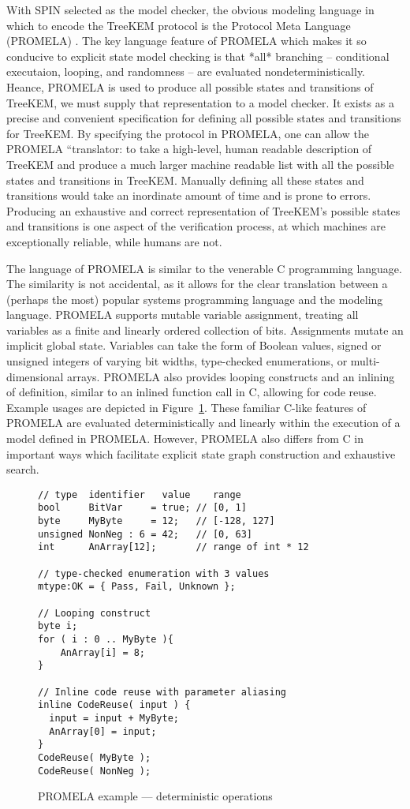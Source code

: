 With SPIN selected as the model checker, the obvious modeling language in which to encode the TreeKEM protocol is the Protocol Meta Language (PROMELA) \autocite{holzmann1980basic, holzmann1990design}.
The key language feature of PROMELA which makes it so conducive to explicit state model checking is that *all* branching -- conditional executaion, looping, and randomness -- are evaluated nondeterministically.
Heance, PROMELA is used to produce all possible states and transitions of TreeKEM, we must supply that representation to a model checker.
It exists as a precise and convenient specification for defining all possible states and transitions for TreeKEM.\@
By specifying the protocol in PROMELA, one can allow the PROMELA ``translator: to take a high-level, human readable description of TreeKEM and produce a much larger machine readable list with all the possible states and transitions in TreeKEM.\@
Manually defining all these states and transitions would take an inordinate amount of time and is prone to errors.
Producing an exhaustive and correct representation of TreeKEM's possible states and transitions is one aspect of the verification process, at which machines are exceptionally reliable, while humans are not.

The language of PROMELA is similar to the venerable C programming language.
The similarity is not accidental, as it allows for the clear translation between a (perhaps the most) popular systems programming language and the modeling language.
PROMELA supports mutable variable assignment, treating all variables as a finite and linearly ordered collection of bits.
Assignments mutate an implicit global state.
Variables can take the form of Boolean values, signed or unsigned integers of varying bit widths, type-checked enumerations, or multi-dimensional arrays.
PROMELA also provides looping constructs and an inlining of definition, similar to an inlined function call in C, allowing for code reuse.
Example usages are depicted in Figure\ \ref{fig:determinism}.
These familiar C-like features of PROMELA are evaluated deterministically and linearly within the execution of a model defined in PROMELA.\@
However, PROMELA also differs from C in important ways which facilitate explicit state graph construction and exhaustive search.

\begin{figure}
\centering
\caption{\label{fig:determinism} PROMELA example --- deterministic operations}
\begin{verbatim}
// type  identifier   value    range
bool     BitVar     = true; // [0, 1]
byte     MyByte     = 12;   // [-128, 127]
unsigned NonNeg : 6 = 42;   // [0, 63]
int      AnArray[12];       // range of int * 12

// type-checked enumeration with 3 values
mtype:OK = { Pass, Fail, Unknown };

// Looping construct
byte i;
for ( i : 0 .. MyByte ){
    AnArray[i] = 8;
}

// Inline code reuse with parameter aliasing
inline CodeReuse( input ) {
  input = input + MyByte;
  AnArray[0] = input;
}
CodeReuse( MyByte );
CodeReuse( NonNeg );
\end{verbatim}
\end{figure}


